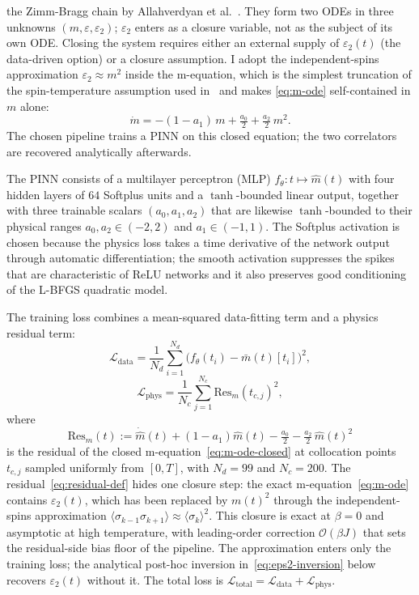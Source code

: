 \documentclass[conference]{IEEEtran}
\newcommand{\mhat}{\hat m(t)}
\newcommand{\mbar}{\bar m(t)}
\newcommand{\eps}{\varepsilon}
\newcommand{\epstwo}{\varepsilon_2}
\begin{document}
the Zimm-Bragg chain by Allahverdyan et
al.~\cite{allahverdyan2009kinetics}. They form two ODEs in three
unknowns $(m, \eps, \epstwo)$; $\epstwo$ enters as a closure variable,
not as the subject of its own ODE. Closing the system requires either an
external supply of $\epstwo(t)$ (the data-driven option) or a closure assumption. I adopt the independent-spins approximation
$\epstwo \approx m^2$ inside the m-equation, which is the simplest
truncation of the spin-temperature assumption used
in~\cite{allahverdyan2009kinetics} and makes \eqref{eq:m-ode}
self-contained in $m$ alone:
\begin{equation}
  \dot m = -(1 - a_1)\,m + \tfrac{a_0}{2} + \tfrac{a_2}{2}\,m^2.
  \label{eq:m-ode-closed}
\end{equation}
The chosen pipeline trains a PINN on this closed equation; the two
correlators are recovered analytically afterwards.


The PINN consists of a multilayer perceptron (MLP) $f_\theta:\!t \mapsto \mhat$
with four hidden layers of $64$ Softplus units and a $\tanh$-bounded
linear output, together with three trainable scalars
$(a_0, a_1, a_2)$ that are likewise $\tanh$-bounded to their physical
ranges $a_0, a_2 \in (-2, 2)$ and $a_1 \in (-1, 1)$. The Softplus
activation is chosen because the physics loss takes a time derivative of
the network output through automatic differentiation; the smooth
activation suppresses the spikes that are characteristic of ReLU networks and
it also preserves good conditioning of the L-BFGS quadratic model.

The training loss combines a mean-squared data-fitting term and a physics
residual term:
\begin{equation}
  \mathcal{L}_\text{data} = \frac{1}{N_d} \sum_{i=1}^{N_d} \bigl(f_\theta(t_i) - \mbar[t_i]\bigr)^2,
  \label{eq:l-data}
\end{equation}
\begin{equation}
  \mathcal{L}_\text{phys} = \frac{1}{N_c} \sum_{j=1}^{N_c}
    \mathrm{Res}_m(t_{c,j})^2,
  \label{eq:l-phys}
\end{equation}
where
\begin{equation}
  \mathrm{Res}_m(t) := \dot{\hat m}(t) + (1 - a_1)\hat m(t)
    - \tfrac{a_0}{2} - \tfrac{a_2}{2}\,\hat m(t)^2
  \label{eq:residual-def}
\end{equation}
is the residual of the closed m-equation~\eqref{eq:m-ode-closed} at
collocation points $t_{c,j}$ sampled uniformly from $[0, T]$, with
$N_d = 99$ and $N_c = 200$. The residual~\eqref{eq:residual-def} hides
one closure step: the exact m-equation~\eqref{eq:m-ode} contains
$\epstwo(t)$, which has been replaced by $m(t)^2$ through the
independent-spins approximation
$\langle\sigma_{k-1}\sigma_{k+1}\rangle \approx \langle\sigma_k\rangle^2$.
This closure is exact at $\beta = 0$ and asymptotic at high temperature,
with leading-order correction $\mathcal{O}(\beta J)$ that sets the
residual-side bias floor of the pipeline. The approximation enters only
the training loss; the analytical post-hoc inversion
in~\eqref{eq:eps2-inversion} below recovers $\epstwo(t)$ without it.
The total loss is
$\mathcal{L}_\text{total} = \mathcal{L}_\text{data} + \mathcal{L}_\text{phys}$.
\end{document}
